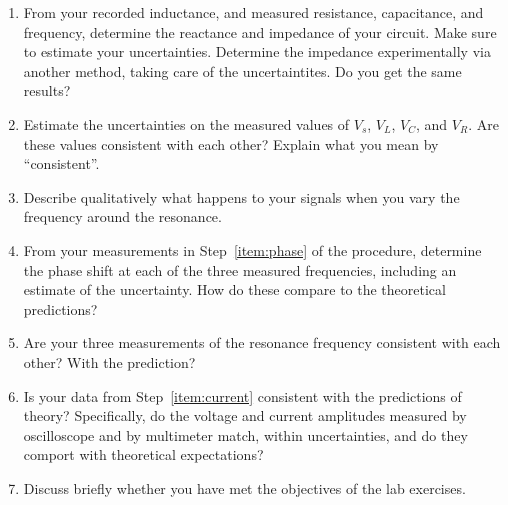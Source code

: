 \documentclass[12pt]{article}
\begin{document}
\begin{enumerate}
\item From your recorded inductance, and measured resistance,
  capacitance, and frequency, determine the reactance and impedance of
  your circuit.  Make sure to estimate your uncertainties.  Determine
  the impedance experimentally via another method, taking care of the
  uncertaintites.%
  Do you get the same results?
\item Estimate the uncertainties on the measured values of $V_s$,
  $V_L$, $V_C$, and $V_R$.  Are these values consistent with each
  other?  Explain what you mean by ``consistent''.
\item Describe qualitatively what happens to your signals when you
  vary the frequency around the resonance.
\item From your measurements in Step~\ref{item:phase} of the
  procedure, determine the phase shift at each of the three measured
  frequencies, including an estimate of the uncertainty.  How do these
  compare to the theoretical predictions? 
\item Are your three measurements of the resonance frequency
  consistent with each other?  With the prediction?
\item Is your data from Step~\ref{item:current} consistent with the
  predictions of theory?  Specifically, do the voltage and current
  amplitudes measured by oscilloscope and by multimeter match, within
  uncertainties, and do they comport with theoretical expectations?
\item Discuss briefly whether you have met the objectives of the lab
  exercises.
\end{enumerate}
\end{document}
